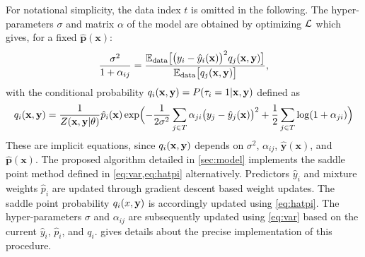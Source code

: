 For notational simplicity, the data index $t$ is omitted in the following. The 
hyper-parameters $\sigma$ and matrix $\alpha$ of the model are obtained by 
optimizing ${\cal L}$ which gives, for a fixed $\hat{\mathbf{p}}(\mathbf{x})$:
%
\begin{equation}\label{eq:var}
  \frac{\sigma^2}{1+\alpha_{ij}} = 
  \frac{
    {\mathbb E}_{\rm data}\bigl[\bigl(y_i-\hat y_i(\mathbf{x})\bigr)^2q_j(\mathbf{x},{\bf y})\bigr]
  }{
    {\mathbb E}_{\rm data}\bigl[q_j(\mathbf{x},{\bf y})\bigr]
  },
\end{equation}
%
with the conditional probability 
$q_i(\mathbf{x},{\bf y}) = P(\tau_i=1\vert \mathbf{x},{\bf y})$ defined as
%
\begin{equation}\label{eq:hatpi}
  q_i(\mathbf{x},{\bf y}) = \frac{1}{Z(\mathbf{x},{\bf y}\vert\theta)}
    \hat p_i(\mathbf{x})\exp\Bigl(
      - \frac{1}{2\sigma^2}\sum_{j\in T}\alpha_{ji}
        \bigl(y_j-\hat y_j(\mathbf{x})\bigr)^2 + 
        \frac{1}{2}\sum_{j\in T}\log(1+\alpha_{ji})
        \Bigr)
\end{equation}
%
%
These are implicit equations, since $q_i(\mathbf{x},{\bf y})$ depends on $\sigma^2$, $\alpha_{ij}$, 
$\hat{\mathbf{y}}(\mathbf{x})$, and $\hat{\mathbf{p}}(\mathbf{x})$. The proposed algorithm detailed 
in \cref{sec:model} implements the saddle point method defined in \cref{eq:var,eq:hatpi} 
alternatively. Predictors $\hat y_i$ and mixture weights $\hat p_i$ are updated through 
gradient descent based weight updates. The saddle point probability $q_i(x,{\bf y})$ is accordingly 
updated using \cref{eq:hatpi}. The hyper-parameters $\sigma$ and $\alpha_{ij}$ are subsequently 
updated using \cref{eq:var} based on the current $\hat y_i$, $\hat p_i$, and $q_i$. 
 gives details about the precise implementation of this procedure.


